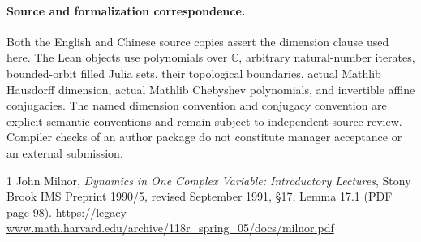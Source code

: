 \documentclass[11pt]{article}
\newcommand{\C}{\mathbb C}
\begin{document}
\paragraph{Source and formalization correspondence.}
Both the English and Chinese source copies assert the dimension clause used
here. The Lean objects use polynomials over $\C$, arbitrary natural-number
iterates, bounded-orbit filled Julia sets, their topological boundaries, actual
Mathlib Hausdorff dimension, actual Mathlib Chebyshev polynomials, and
invertible affine conjugacies. The named dimension convention and conjugacy
convention are explicit semantic conventions and remain subject to independent
source review. Compiler checks of an author package do not constitute manager
acceptance or an external submission.

\begin{thebibliography}{1}
John Milnor, \emph{Dynamics in One Complex Variable: Introductory Lectures},
Stony Brook IMS Preprint 1990/5, revised September 1991,
\S17, Lemma 17.1 (PDF page 98).
\url{https://legacy-www.math.harvard.edu/archive/118r_spring_05/docs/milnor.pdf}
\end{thebibliography}
\end{document}
